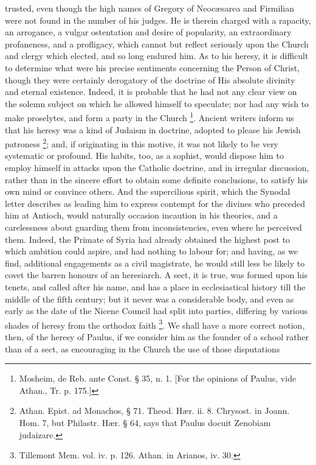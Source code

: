 trusted, even though the high names of Gregory of Neocæsarea and
Firmilian were not found in the number of his judges. He is therein
charged with a rapacity, an arrogance, a vulgar ostentation and desire
of popularity, an extraordinary profaneness, and a profligacy, which
cannot but reflect seriously upon the Church and clergy which elected,
and so long endured him. As to his heresy, it is difficult to
determine what were his precise sentiments concerning the Person of
Christ, though they were certainly derogatory of the doctrine of His
absolute divinity and eternal existence. Indeed, it is probable that
he had not any clear view on the solemn subject on which he allowed
himself to speculate; nor had any wish to make proselytes, and form a
party in the Church \footnote{Mosheim, de Reb. ante Const. § 35, n. 1.
[For the opinions of Paulus, vide Athan., Tr. p. 175.]}.
Ancient writers inform us that his heresy was a kind of Judaism in
doctrine, adopted to please his Jewish patroness \footnote{Athan. Epist. ad Monachos, § 71. Theod.
Hær. ii. 8. Chrysost. in Joann. Hom. 7, but Philastr. Hær. § 64,
says that Paulus docuit Zenobiam judaizare.}; and, if originating in this motive, it was not likely to be
very systematic or profound. His habits, too, as a sophist, would
dispose him to employ himself in attacks upon the Catholic doctrine,
and in irregular discussion, rather than in the sincere effort to
obtain some definite conclusions, to satisfy his own mind or convince
others. And the supercilious spirit, which the Synodal letter
describes as leading him to express contempt for the divines who
preceded him at Antioch, would naturally occasion incaution in his
theories, and a carelessness about guarding them from inconsistencies,
even where he perceived them. Indeed, the Primate of Syria had already
obtained the highest post to which ambition could aspire, and had
nothing to labour for; and having, as we find, additional engagements
as a civil magistrate, he would still less be likely to covet the
barren honours of an heresiarch. A sect, it is true, was formed upon
his tenets, and called after his name, and has a place in
ecclesiastical history till the middle of the fifth century; but it
never was a considerable body, and even as early as the date of the
Nicene Council had split into parties, differing by various shades of
heresy from the orthodox faith \footnote{Tillemont Mem. vol. iv. p. 126. Athan. in
Arianos, iv. 30.}. We shall have a more correct notion, then, of the heresy of
Paulus, if we consider him as the founder of a school rather than
of a sect, as encouraging in the Church the use of those disputations
